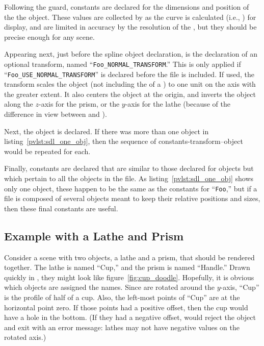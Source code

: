	Following the guard, constants are declared for the
	dimensions and position of the the object.
	These values are collected
	by \IXpkg{} as the curve is calculated
	(i.e., ) for display,
	and are limited in accuracy by the resolution of the
	, but they should be precise enough
	for any scene.
	
	Appearing next, just before the spline object
	declaration, is the declaration of an optional transform,
	named ``\texttt{Foo\_NORMAL\_TRANSFORM}.''
	This is only applied if
	``\texttt{Foo\_USE\_NORMAL\_TRANSFORM}''
	is declared before the
	file is included. If used, the transform scales the object
	(not including the \emph{} of a )
	to one unit on the axis with the greater extent. It also
	centers the object at the origin, and inverts the object
	along the $z$-axis for the prism,
	or the $y$-axis for the lathe (because of the difference in view
	between \IXpov{} and \IXpkg{}).
	
	Next, the object is declared. If there was more than
	one object in listing~\ref{pvlst:sdl_one_obj},
	then the sequence of constants-transform--object would
	be repeated for each.
	
	Finally, constants are declared that are similar to those
	declared for objects
	but which pertain to all the objects in the file.
	As listing~\ref{pvlst:sdl_one_obj} shows only one object,
	these happen to be the same as the constants for
	``\texttt{Foo},'' but if a file is composed of several
	objects meant to keep their relative positions and sizes,
	then these final constants are useful.


		\subsection{Example with a Lathe and Prism}%
		\label{ssec:ex_lath_and_prism}
		Consider a scene with two objects, a lathe and a
		prism, that should be rendered together. The lathe
		is named ``Cup,'' and the prism is named ``Handle.''
		Drawn quickly in \IXpkg{}, they might look like
		figure~\ref{fig:cup_doodle}.
		Hopefully, it is obvious which objects are assigned
		the names. Since  are rotated around
		the $y$-axis, ``Cup'' is the profile of half of a cup.
		Also, the left-most points of ``Cup'' are at the
		horizontal point zero. If those points had a positive
		offset, then the cup would have a hole in the bottom.
		(If they had a negative offset, \IXpov{} would reject
		the object and exit with an error message: lathes may
		not have negative values on the rotated axis.)

